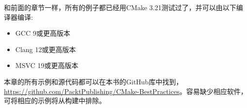 和前面的章节一样，所有的例子都已经用CMake 3.21测试过了，并可以由以下编译器编译:

\begin{itemize}
\item 
GCC 9或更高版本

\item 
Clang 12或更高版本

\item 
MSVC 19或更高版本
\end{itemize}

本章的所有示例和源代码都可以在本书的GitHub库中找到，\url{https://github.com/PacktPublishing/CMake-BestPractices}。容易缺少相应软件，可将相应的示例将从构建中排除。











